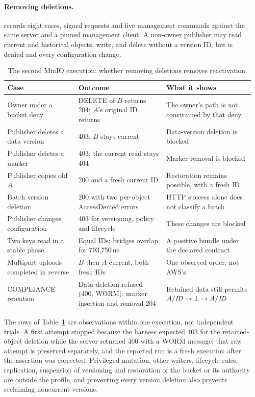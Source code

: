 \paragraph{Removing deletions.}  records
eight cases, \nProfileRequests{} signed requests and five management commands
against the same server and a pinned management client. A non-owner publisher
may read current and historical objects, write, and delete without a version
ID, but is denied  and every configuration change.

\begin{table}[t]
\caption{The second MinIO execution: whether removing deletions removes reactivation.}
\label{tab:profile}
\small
\begin{tabularx}{\textwidth}{@{}lXX@{}}
\toprule
Case & Outcome & What it shows \\
\midrule
Owner under a bucket deny & DELETE of $B$ returns 204; $A$'s original ID returns & The owner's path is not constrained by that deny \\
Publisher deletes a data version & 403; $B$ stays current & Data-version deletion is blocked \\
Publisher deletes a marker & 403; the current read stays 404 & Marker removal is blocked \\
Publisher copies old $A$ & 200 and a fresh current ID & Restoration remains possible, with a fresh ID \\
Batch version deletion & 200 with two per-object AccessDenied errors & HTTP success alone does not classify a batch \\
Publisher changes configuration & 403 for versioning, policy and lifecycle & These changes are blocked \\
Two keys read in a stable phase & Equal IDs; bridges overlap for 793{,}750\,ns & A positive bundle under the declared contract \\
Multipart uploads completed in reverse & $B$ then $A$ current, both fresh IDs & One observed order, not AWS's \\
COMPLIANCE retention & Data deletion refused (400, WORM); marker insertion and removal 204 & Retained data still permits $A/\mathit{ID}\to\bot\to A/\mathit{ID}$ \\
\bottomrule
\end{tabularx}
\end{table}

The rows of Table~\ref{tab:profile} are observations within one execution, not
independent trials. A first attempt stopped because the harness expected 403
for the retained-object deletion while the server returned 400 with a WORM
message; that raw attempt is preserved separately, and the reported run is a
fresh execution after the assertion was corrected. Privileged mutation, other
writers, lifecycle rules, replication, suspension of versioning and
restoration of the bucket or its authority are outside the profile, and
preventing every version deletion also prevents reclaiming noncurrent
versions.

